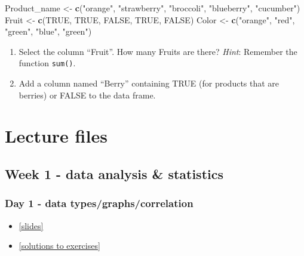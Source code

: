 \documentclass[
]{book}
\newenvironment{Shaded}{\begin{snugshade}}{\end{snugshade}}
\newcommand{\ConstantTok}[1]{\textcolor[rgb]{0.56,0.35,0.01}{#1}}
\newcommand{\FunctionTok}[1]{\textcolor[rgb]{0.13,0.29,0.53}{\textbf{#1}}}
\newcommand{\NormalTok}[1]{#1}
\newcommand{\OtherTok}[1]{\textcolor[rgb]{0.56,0.35,0.01}{#1}}
\newcommand{\StringTok}[1]{\textcolor[rgb]{0.31,0.60,0.02}{#1}}
\providecommand{\tightlist}{%
  \setlength{\itemsep}{0pt}\setlength{\parskip}{0pt}}
\begin{document}
\begin{Shaded}
\begin{Highlighting}[]
\NormalTok{Product\_name }\OtherTok{\textless{}{-}} \FunctionTok{c}\NormalTok{(}\StringTok{"orange"}\NormalTok{, }\StringTok{"strawberry"}\NormalTok{, }\StringTok{"broccoli"}\NormalTok{, }\StringTok{"blueberry"}\NormalTok{, }\StringTok{"cucumber"}\NormalTok{)}
\NormalTok{Fruit }\OtherTok{\textless{}{-}} \FunctionTok{c}\NormalTok{(}\ConstantTok{TRUE}\NormalTok{, }\ConstantTok{TRUE}\NormalTok{, }\ConstantTok{FALSE}\NormalTok{, }\ConstantTok{TRUE}\NormalTok{, }\ConstantTok{FALSE}\NormalTok{)}
\NormalTok{Color }\OtherTok{\textless{}{-}} \FunctionTok{c}\NormalTok{(}\StringTok{"orange"}\NormalTok{, }\StringTok{"red"}\NormalTok{, }\StringTok{"green"}\NormalTok{, }\StringTok{"blue"}\NormalTok{, }\StringTok{"green"}\NormalTok{)}
\end{Highlighting}
\end{Shaded}

\begin{enumerate}
\def\labelenumi{\arabic{enumi}.}
\setcounter{enumi}{1}
\item
  Select the column ``Fruit''.
  How many Fruits are there?
  \emph{Hint}: Remember the function \texttt{sum()}.
\item
  Add a column named ``Berry'' containing TRUE (for products that are berries) or FALSE to the data frame.
\end{enumerate}

\hypertarget{lecture-files}{%
\chapter{Lecture files}\label{lecture-files}}

\hypertarget{week-1---data-analysis-statistics}{%
\section{Week 1 - data analysis \& statistics}\label{week-1---data-analysis-statistics}}

\hypertarget{day-1---data-typesgraphscorrelation}{%
\subsection{Day 1 - data types/graphs/correlation}\label{day-1---data-typesgraphscorrelation}}

\begin{itemize}
\tightlist
\item
  \href{./slides/GKBioinfo_week1_day1.pdf}{{[}slides{]}}
\item
  \href{./slides/solution_day1.Rmd}{{[}solutions to exercises{]}}
\end{itemize}
\end{document}
